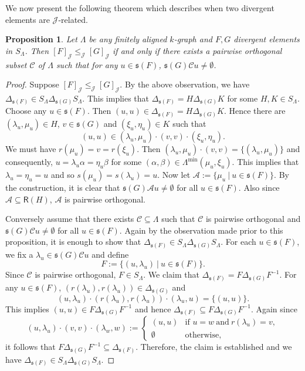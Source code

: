 \documentclass[a4paper,reqno,11pt]{amsart}
\numberwithin{equation}{section}
\newtheorem{prop}[thm]{Proposition}
\theoremstyle{definition}
\theoremstyle{remark}
\begin{document}
We now present the following theorem which describes when two divergent elements are $\mathscr{J}$-related.
\begin{prop}\label{pro partial orders on equivalence classes J}
Let $\Lambda$ be any finitely aligned $k$-graph and $F,G$ divergent elements in $S_\Lambda$. Then $[F]_{\mathscr{J}}\le_{\mathscr{J}} [G]_{\mathscr{J}}$ if and only if there exists a pairwise orthogonal subset $\mathcal{C}$ of $\Lambda$ such that for any $u\in \mathfrak{s}(F)$, $\mathfrak{s}(G)\mathcal{C}u\neq \emptyset$.
\end{prop}
\begin{proof}
Suppose $[F]_{\mathscr{J}}\le_{\mathscr{J}} [G]_{\mathscr{J}}$. By the above observation, we have $\Delta_{\mathfrak{s}(F)}\in S_\Lambda \Delta_{\mathfrak{s}(G)} S_\Lambda$. This implies that $\Delta_{\mathfrak{s}(F)}=H \Delta_{\mathfrak{s}(G)}K$ for some $H,K\in S_\Lambda$. Choose any $u\in \mathfrak{s}(F)$. Then $(u,u)\in \Delta_{\mathfrak{s}(F)}=H \Delta_{\mathfrak{s}(G)}K$. Hence there are $(\lambda_u,\mu_u)\in H$, $v\in \mathfrak{s}(G)$ and $(\xi_u,\eta_u)\in K$ such that \[(u,u)\in (\lambda_u,\mu_u)\cdot (v,v)\cdot (\xi_u,\eta_u).\] We must have $r(\mu_u)=v=r(\xi_u)$. Then $(\lambda_u,\mu_u)\cdot (v,v)=\{(\lambda_u,\mu_u)\}$ and consequently, $u=\lambda_u \alpha=\eta_u\beta$ for some $(\alpha,\beta)\in \Lambda^{\min}(\mu_u,\xi_u)$. This implies that $\lambda_u=\eta_u=u$ and so $s(\mu_u)=s(\lambda_u)=u$. Now let $\mathcal{A}:=\{\mu_u~|~u\in \mathfrak{s}(F)\}$. By the construction, it is clear that $\mathfrak{s}(G)\mathcal{A}u\neq \emptyset$ for all $u\in \mathfrak{s}(F)$. Also since $\mathcal{A}\subseteq \mathsf{R}(H)$, $\mathcal{A}$ is pairwise orthogonal. 

Conversely assume that there exists $\mathcal{C}\subseteq \Lambda$ such that $\mathcal{C}$ is pairwise orthogonal and $\mathfrak{s}(G)\mathcal{C}u\neq \emptyset$ for all $u\in \mathfrak{s}(F)$. Again by the observation made prior to this proposition, it is enough to show that $\Delta_{\mathfrak{s}(F)}\in S_\Lambda \Delta_{\mathfrak{s}(G)} S_\Lambda$. For each $u\in \mathfrak{s}(F)$, we fix a $\lambda_u\in \mathfrak{s}(G)\mathcal{C}u$ and define \[F:=\{(u,\lambda_u)~|~u\in \mathfrak{s}(F)\}.\] Since $\mathcal{C}$ is pairwise orthogonal, $F\in S_\Lambda$. We claim that $\Delta_{\mathfrak{s}(F)}=F \Delta_{\mathfrak{s}(G)} F^{-1}$. For any $u\in \mathfrak{s}(F)$, $(r(\lambda_u),r(\lambda_u))\in \Delta_{\mathfrak{s}(G)}$ and \[(u,\lambda_u)\cdot (r(\lambda_u),r(\lambda_u))\cdot (\lambda_u,u)=\{(u,u)\}.\] This implies $(u,u)\in F\Delta_{\mathfrak{s}(G)}F^{-1}$ and hence $\Delta_{\mathfrak{s}(F)}\subseteq F\Delta_{\mathfrak{s}(G)}F^{-1}$. Again since 
\[(u,\lambda_u)\cdot (v,v)\cdot (\lambda_w,w):=
	\left\{
	\begin{array}{ll}
		 (u,u)  & \mbox{if } u=w~\text{and}~r(\lambda_u)=v, \\
	   \emptyset  & \mbox{otherwise},
	\end{array}
	\right.
\] it follows that $F\Delta_{\mathfrak{s}(G)}F^{-1}\subseteq \Delta_{\mathfrak{s}(F)}$. Therefore, the claim is established and we have $\Delta_{\mathfrak{s}(F)}\in S_\Lambda \Delta_{\mathfrak{s}(G)} S_\Lambda$. 
\end{proof}
\end{document}
